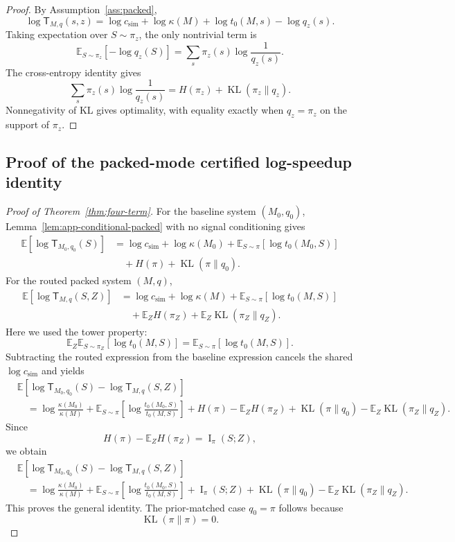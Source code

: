 \documentclass{article}
\DeclareMathOperator{\KL}{KL}
\DeclareMathOperator{\MI}{I}
\newcommand{\E}{\mathbb{E}}
\begin{document}
\begin{proof}
By Assumption~\ref{ass:packed},
\[
    \log \mathsf T_{M,q}(s,z)
    =
    \log c_{\mathrm{sim}}
    +
    \log\kappa(M)
    +
    \log t_0(M,s)
    -
    \log q_z(s).
\]
Taking expectation over \(S\sim\pi_z\), the only nontrivial term is
\[
    \E_{S\sim\pi_z}[-\log q_z(S)]
    =
    \sum_s \pi_z(s)\log\frac{1}{q_z(s)}.
\]
The cross-entropy identity gives
\[
    \sum_s \pi_z(s)\log\frac{1}{q_z(s)}
    =
    H(\pi_z)+\KL(\pi_z\|q_z).
\]
Nonnegativity of KL gives optimality, with equality exactly when \(q_z=\pi_z\) on the
support of \(\pi_z\).
\end{proof}

\subsection{Proof of the packed-mode certified log-speedup identity}

\begin{proof}[Proof of Theorem~\ref{thm:four-term}]
For the baseline system \((M_0,q_0)\), Lemma~\ref{lem:app-conditional-packed} with no
signal conditioning gives
\[
\begin{aligned}
    \E[\log \mathsf T_{M_0,q_0}(S)]
    &=
    \log c_{\mathrm{sim}}
    +
    \log\kappa(M_0)
    +
    \E_{S\sim\pi}[\log t_0(M_0,S)]
    \\
    &\quad
    +
    H(\pi)
    +
    \KL(\pi\|q_0).
\end{aligned}
\]
For the routed packed system \((M,q)\),
\[
\begin{aligned}
    \E[\log \mathsf T_{M,q}(S,Z)]
    &=
    \log c_{\mathrm{sim}}
    +
    \log\kappa(M)
    +
    \E_{S\sim\pi}[\log t_0(M,S)]
    \\
    &\quad
    +
    \E_ZH(\pi_Z)
    +
    \E_Z\KL(\pi_Z\|q_Z).
\end{aligned}
\]
Here we used the tower property:
\[
    \E_Z\E_{S\sim\pi_Z}[\log t_0(M,S)]
    =
    \E_{S\sim\pi}[\log t_0(M,S)].
\]
Subtracting the routed expression from the baseline expression cancels the shared
\(\log c_{\mathrm{sim}}\) and yields
\[
\begin{aligned}
&\E[
    \log \mathsf T_{M_0,q_0}(S)
    -
    \log \mathsf T_{M,q}(S,Z)
]
\\
&\quad =
\log\frac{\kappa(M_0)}{\kappa(M)}
+
\E_{S\sim\pi}
\left[
    \log\frac{t_0(M_0,S)}{t_0(M,S)}
\right]
+
H(\pi)-\E_ZH(\pi_Z)
+
\KL(\pi\|q_0)
-
\E_Z\KL(\pi_Z\|q_Z).
\end{aligned}
\]
Since
\[
    H(\pi)-\E_ZH(\pi_Z)=\MI_\pi(S;Z),
\]
we obtain
\[
\begin{aligned}
&\E[
    \log \mathsf T_{M_0,q_0}(S)
    -
    \log \mathsf T_{M,q}(S,Z)
]
\\
&\quad =
\log\frac{\kappa(M_0)}{\kappa(M)}
+
\E_{S\sim\pi}
\left[
    \log\frac{t_0(M_0,S)}{t_0(M,S)}
\right]
+
\MI_\pi(S;Z)
+
\KL(\pi\|q_0)
-
\E_Z\KL(\pi_Z\|q_Z).
\end{aligned}
\]
This proves the general identity.  The prior-matched case \(q_0=\pi\) follows because
\[
    \KL(\pi\|\pi)=0.
\]
\end{proof}
\end{document}
